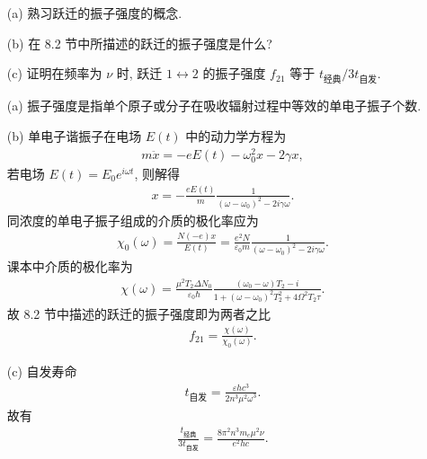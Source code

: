 \documentclass{note}
\begin{document}
\begin{exe}
    \begin{itemize}
        \item[(a)] 熟习跃迁的振子强度的概念.
        \item[(b)] 在 8.2 节中所描述的跃迁的振子强度是什么?
        \item[(c)] 证明在频率为 $\nu$ 时, 跃迁 $1\leftrightarrow 2$ 的振子强度 $f_{21}$ 等于 $t_{\text{经典}}/3t_{\text{自发}}$.
    \end{itemize}
\end{exe}
\begin{sol}
    \begin{itemize}
        \item[(a)] 振子强度是指单个原子或分子在吸收辐射过程中等效的单电子振子个数.
        \item[(b)] 单电子谐振子在电场 $E(t)$ 中的动力学方程为
        \begin{align}
            m\ddot{x}=-eE(t)-\omega_0^2x-2\gamma x,
        \end{align}
        若电场 $E(t)=E_0e^{i\omega t}$, 则解得
        \begin{align}
            x=-\frac{eE(t)}{m}\frac{1}{(\omega-\omega_0)^2-2i\gamma\omega}.
        \end{align}
        同浓度的单电子振子组成的介质的极化率应为
        \begin{align}
            \chi_0(\omega)=\frac{N(-e)x}{E(t)}=\frac{e^2N}{\varepsilon_0m}\frac{1}{(\omega-\omega_0)^2-2i\gamma\omega}.
        \end{align}
        课本中介质的极化率为
        \begin{align}
            \chi(\omega)=\frac{\mu^2T_2\Delta N_0}{\varepsilon_0\hbar}\frac{(\omega_0-\omega)T_2-i}{1+(\omega-\omega_0)^2T_2^2+4\Omega^2T_2\tau}.
        \end{align}
        故 8.2 节中描述的跃迁的振子强度即为两者之比
        \begin{align}
            f_{21}=\frac{\chi(\omega)}{\chi_0(\omega)}.
        \end{align}
        \item[(c)] 自发寿命
        \begin{align}
            t_{\text{自发}}=\frac{\varepsilon hc^3}{2n^3\mu^2\omega^3}.
        \end{align}
        故有
        \begin{align}
            \frac{t_{\text{经典}}}{3t_{\text{自发}}}=\frac{8\pi^2n^3m_e\mu^2\nu}{e^2hc}.
        \end{align}
    \end{itemize}%
\end{sol}
\end{document}
